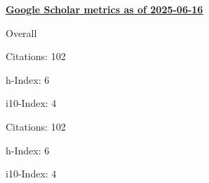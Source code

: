 \textbf{\href{https://scholar.google.it/citations?user=iJDPEaUAAAAJ&hl=it&oi=ao}{Google Scholar metrics as of 2025-06-16}}
\medskip
\centering
\begin{minipage}{.4\textwidth}
    \begin{outerlist}
        \item[] Overall
        \begin{innerlist}
            \item Citations: 102
            \item h-Index: 6
            \item i10-Index: 4
        \end{innerlist}
    \end{outerlist}
\end{minipage}
\hfill
\begin{minipage}{.4\textwidth}
    \begin{outerlist}
        \item[] 
        \begin{innerlist}
            \item Citations: 102
            \item h-Index: 6
            \item i10-Index: 4
        \end{innerlist}
    \end{outerlist}
\end{minipage}
\vspace{1em}
